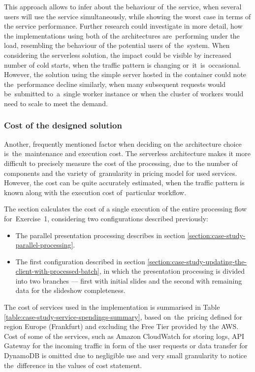 \begin{itemize}
    This approach allows to infer about the behaviour of~the service, when several users will use the service simultaneously, while showing the worst case in terms of the service performance.
    Further research could investigate in more detail, how the implementations using both of the architectures are~performing under the load, resembling the behaviour of the potential users of~the~system.
    When considering the serverless solution, the impact could be visible by increased number of cold starts, when the traffic pattern is changing or~it~is~occasional. However, the solution using the simple server hosted in the container could note the~performance decline similarly, when many subsequent requests would be~submitted to~a~single worker instance or when the cluster of workers would need to scale to meet the demand.
\end{itemize}

\subsubsection{Cost of the designed solution}

Another, frequently mentioned factor when deciding on the architecture choice is~the~maintenance and execution cost. The serverless architecture makes it more difficult to precisely measure the cost of the processing, due to the number of components and the variety of~granularity in pricing model for used services. However, the cost can be quite accurately estimated, when the traffic pattern is known along with the execution cost of~particular workflow.

The section calculates the cost of a single execution of the entire processing flow for~Exercise~1, considering two configurations described previously:

\begin{itemize}
   \item The parallel presentation processing describes in section \ref{section:case-study-parallel-processing}.
   \item The first configuration described in section \ref{section:case-study-updating-the-client-with-processed-batch}, in which the presentation processing is divided into two branches --- first with initial slides and the second with remaining data for the slideshow completeness.
\end{itemize}

The cost of services used in the implementation is summarised in Table \ref{table:case-study-service-spendings-summary}, based on~the~pricing defined for region Europe (Frankfurt) and excluding the Free Tier provided by the AWS.
Cost of some of the services, such as Amazon CloudWatch for storing logs, API Gateway for the incoming traffic in form of the user requests or data transfer for DynamoDB is omitted due to negligible use and very small granularity to notice the~difference in the values of cost statement.

